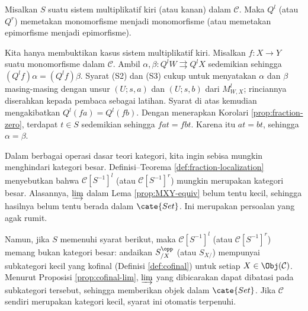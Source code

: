 \begin{korolari}\label{prop:fraction-mono-epi}
	Misalkan $S$ suatu sistem multiplikatif kiri (atau kanan) dalam
	$\mathcal{C}$. Maka $Q^l$ (atau $Q^r$) memetakan monomorfisme menjadi
	monomorfisme (atau memetakan epimorfisme menjadi epimorfisme).
\end{korolari}
\begin{bukti}
	Kita hanya membuktikan kasus sistem multiplikatif kiri. Misalkan
	$f:X\to Y$ suatu monomorfisme dalam $\mathcal{C}$. Ambil
	$\alpha,\beta:Q^lW\rightrightarrows Q^lX$ sedemikian sehingga
	$(Q^lf)\alpha=(Q^lf)\beta$. Syarat (S2) dan (S3) cukup untuk menyatakan
	$\alpha$ dan $\beta$ masing-masing dengan unsur $(U;s,a)$ dan $(U;s,b)$
	dari $M^l_{W,X}$; rinciannya diserahkan kepada pembaca sebagai latihan.
	Syarat di atas kemudian mengakibatkan $Q^l(fa)=Q^l(fb)$. Dengan menerapkan
	Korolari \ref{prop:fraction-zero}, terdapat $t\in S$ sedemikian sehingga
	$fat=fbt$. Karena itu $at=bt$, sehingga $\alpha=\beta$.
\end{bukti}

\begin{catatan}\label{rem:localization-size}
	Dalam berbagai operasi dasar teori kategori, kita ingin sebisa mungkin
	menghindari kategori besar. Definisi--Teorema
	\ref{def:fraction-localization} menyebutkan bahwa
	$\mathcal{C}[S^{-1}]^l$ (atau $\mathcal{C}[S^{-1}]^r$) mungkin merupakan
	kategori besar. Alasannya, $\varinjlim$ dalam Lema
	\ref{prop:MXY-equiv} belum tentu kecil, sehingga hasilnya belum tentu
	berada dalam $\cate{Set}$. Ini merupakan persoalan yang agak rumit.

	Namun, jika $S$ memenuhi syarat berikut, maka
	$\mathcal{C}[S^{-1}]^l$ (atau $\mathcal{C}[S^{-1}]^r$) memang bukan
	kategori besar: andaikan $S_{/X}^{\opp}$ (atau $S_{X/}$) mempunyai
	subkategori kecil yang kofinal (Definisi \ref{def:cofinal}) untuk setiap
	$X\in\Obj(\mathcal{C})$. Menurut Proposisi \ref{prop:cofinal-lim},
	$\varinjlim$ yang dibicarakan dapat dibatasi pada subkategori tersebut,
	sehingga memberikan objek dalam $\cate{Set}$. Jika $\mathcal{C}$ sendiri
	merupakan kategori kecil, syarat ini otomatis terpenuhi.
\end{catatan}

